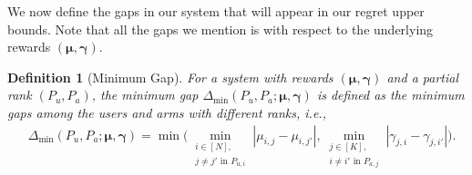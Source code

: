 \documentclass{article}
\newtheorem{definition}{Definition}
\begin{document}
We now define the gaps in our system that will appear in our regret upper bounds. Note that all the gaps we mention is with respect to the underlying rewards $(\boldsymbol{\mu}, \boldsymbol{\gamma})$. 
\begin{definition}[Minimum Gap]
    For a system with rewards $(\boldsymbol{\mu}, \boldsymbol{\gamma})$ and a partial rank $(P_{u}, P_{a})$, the minimum gap $\Delta_{\min}(P_{u}, P_{a}; \boldsymbol{\mu}, \boldsymbol{\gamma})$ is defined as the minimum gaps among the users and arms with different ranks, i.e.,
    \begin{align*}
        &\Delta_{\min}(P_{u}, P_{a}; \boldsymbol{\mu}, \boldsymbol{\gamma})
        = \min\big(\min\limits_{\substack{i \in [N],\\ j \neq j' \text{ in } P_{u,i}}} |\mu_{i,j} - \mu_{i, j'}|, \min\limits_{\substack{j \in [K],\\ i \neq i' \text{ in } P_{a,j}}} |\gamma_{j,i} - \gamma_{j, i'}|\big).
    \end{align*}
\end{definition}
\end{document}
